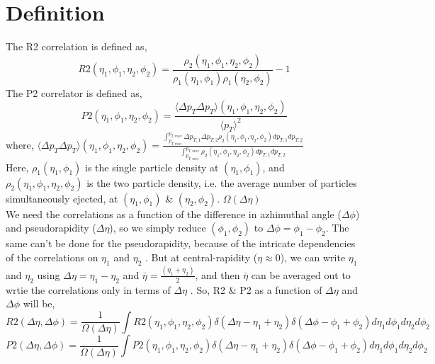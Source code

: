 \documentclass[12pt,a4paper,twoside]{report}
\begin{document}
\section{Definition}
The R2 correlation  is defined as,
\begin{equation}\label{eq:R2(e1p1e2p2)}
	R2(\eta_1,\phi_1,\eta_2,\phi_2)=\frac{\rho_2(\eta_1,\phi_1,\eta_2,\phi_2)}{\rho_1(\eta_1,\phi_1)\rho_1(\eta_2,\phi_2)}-1
\end{equation}
The P2 correlator is defined as,
\begin{equation}\label{eq:P2(e1p1e2p2)}
	P2(\eta_1,\phi_1,\eta_2,\phi_2)=\frac{\langle\Delta p_T \Delta p_T \rangle(\eta_1,\phi_1,\eta_2,\phi_2)}{\langle p_T\rangle^2}
\end{equation}
	where, $\langle\Delta p_T \Delta p_T\rangle(\eta_1,\phi_1,\eta_2,\phi_2)=\frac{\int_{p_{T,min}}^{p_{T,max}}\Delta p_{T,1}\Delta p_{T,2}\rho_2(\eta_1,\phi_1,\eta_2,\phi_2)d p_{T,1}d p_{T,2}}{\int_{p_{T,min}}^{p_{T,max}}\rho_2(\eta_1,\phi_1,\eta_2,\phi_2)d p_{T,1}d p_{T,2}}$\\
Here, $\rho_1(\eta_1,\phi_1)$ is the single particle density at $(\eta_1,\phi_1)$, and $\rho_2(\eta_1,\phi_1,\eta_2,\phi_2)$ is the two particle density, i.e. the average number of particles simultaneously ejected, at $(\eta_1,\phi_1)$ \& $(\eta_2,\phi_2)$. $\Omega(\Delta\eta)$ \\
We need the correlations as a function of the difference in azhimuthal angle ($\Delta\phi$) and pseudorapidity ($\Delta\eta$), so we simply reduce $(\phi_1,\phi_2)$ to $\Delta\phi=\phi_1-\phi_2$. The same can't be done for the pseudorapidity, because of the intricate dependencies of the correlations on $\eta_1$ and $\eta_2$ \cite{Ref:etadep-paper1}\cite{Ref:etadep-paper2}. But at central-rapidity ($\eta\approx0$), we can write $\eta_1$ and $\eta_2$ using $\Delta\eta=\eta_1-\eta_2$ and $\bar{\eta}=\frac{(\eta_1+\eta_2)}{2}$, and then $\bar{\eta}$ can be averaged out to wrtie the correlations only in terms of $\Delta\eta$ \cite{Ref:deta-paper}. So, R2 \& P2 as a function of $\Delta\eta$ and $\Delta\phi$ will be,
\begin{equation}\label{eq:R2(dedp)}
	R2(\Delta\eta,\Delta\phi)=\frac{1}{\Omega(\Delta\eta)}\int R2(\eta_1,\phi_1,\eta_2,\phi_2)\delta(\Delta\eta-\eta_1+\eta_2)\delta(\Delta\phi-\phi_1+\phi_2)d\eta_1 d\phi_1 d\eta_2 d\phi_2
\end{equation}
\begin{equation}\label{eq:P2(dedp)}
	P2(\Delta\eta,\Delta\phi)=\frac{1}{\Omega(\Delta\eta)}\int P2(\eta_1,\phi_1,\eta_2,\phi_2)\delta(\Delta\eta-\eta_1+\eta_2)\delta(\Delta\phi-\phi_1+\phi_2)d\eta_1 d\phi_1 d\eta_2 d\phi_2
\end{equation}
\end{document}
